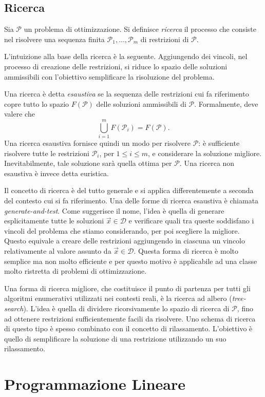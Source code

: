 \subsection{Ricerca}
\begin{definition}
    Sia $\mathcal{P}$ un problema di ottimizzazione. Si definisce
    \textit{ricerca} il \mbox{processo} che consiste nel risolvere una
    sequenza finita $\mathcal{P}_1, \ldots, \mathcal{P}_m$ di restrizioni
    di $\mathcal{P}$.
\end{definition}
L'intuizione alla base della ricerca è la seguente. Aggiungendo dei
vincoli, nel processo di creazione delle restrizioni, si riduce lo
spazio delle soluzioni ammissibili con l'obiettivo semplificare la
risoluzione del problema.

Una ricerca è detta \textit{esaustiva} se la sequenza delle restrizioni cui
fa riferimento copre tutto lo spazio $F(\mathcal{P})$ delle soluzioni
ammissibili di $\mathcal{P}$. Formalmente, deve valere che
\begin{equation}
    \bigcup_{i=1}^{m}F(\mathcal{P}_i) = F(\mathcal{P}).
\end{equation}
Una ricerca esaustiva fornisce quindi un modo per risolvere $\mathcal{P}$:
è sufficiente risolvere tutte le restrizioni $\mathcal{P}_i$, per $1 \le i
\le m$, e considerare la soluzione migliore.  Inevitabilmente, tale
soluzione sarà quella ottima per $\mathcal{P}$. Una ricerca non esaustiva è
invece detta euristica.

Il concetto di ricerca è del tutto generale e si applica differentemente
a seconda del contesto cui si fa riferimento. Una delle forme di
ricerca esaustiva è chiamata \textit{generate-and-test}. Come suggerisce il
nome, l'idea è quella di generare esplicitamente tutte le soluzioni
$\vec{x} \in \mathcal{D}$ e verificare quali tra queste soddisfano i
vincoli del problema che stiamo considerando, per poi scegliere la
migliore. Questo equivale a creare delle restrizioni aggiungendo in
ciascuna un vincolo relativamente al valore assunto da $\vec{x} \in
\mathcal{D}$. Questa forma di ricerca è molto semplice ma non molto
efficiente e per questo motivo è applicabile ad una classe molto ristretta
di problemi di ottimizzazione.

Una forma di ricerca migliore, che costituisce il punto di partenza per
tutti gli algoritmi enumerativi utilizzati nei contesti reali, è la ricerca
ad albero (\textit{tree-search}). L'idea è quella di dividere
ricorsivamente lo spazio di ricerca di $\mathcal{P}$, fino ad ottenere
restrizioni sufficientemente facili da risolvere. Uno schema di ricerca di
questo tipo è spesso combinato con il concetto di rilassamento. L'obiettivo
è quello di semplificare la soluzione di una restrizione utilizzando un suo
rilassamento.

\section{Programmazione Lineare}

